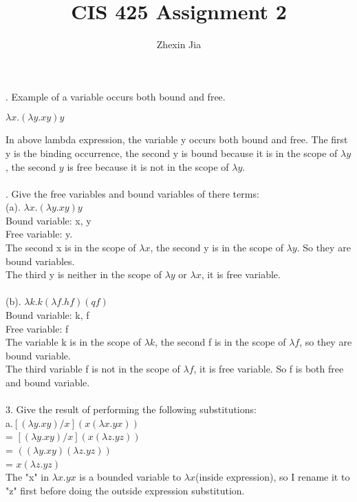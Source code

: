 \documentclass[12pt]{article}
\begin{document}
\title{CIS 425 Assignment 2}
\author{Zhexin Jia}
\maketitle

. Example of a variable occurs both bound and free.
\begin{center}
$\lambda x.(\lambda y.xy)y$
\end{center}
In above lambda expression, the variable y occurs both bound and free. The first y is the binding occurrence, the second y is bound because it is in the scope of $\lambda y$, the second $y$ is free because it is not in the scope of $\lambda y$.\\
\vspace{1mm}\\
. Give the free variables and bound variables of there terms:\\
(a). $\lambda x.(\lambda y.xy)y$\\
Bound variable: x, y\\
Free variable: y. \\
The second x is in the scope of $\lambda x$, the second y is in the scope of $\lambda y$. So they are bound variables.\\
The third y is neither in the scope of $\lambda y$ or $\lambda x$, it is free variable.\\
\vspace{1mm}\\
(b). $\lambda k.k(\lambda f.hf)(qf)$\\
Bound variable: k, f\\
Free variable: f\\
The variable k is in the scope of $\lambda k$, the second f is in the scope of $\lambda f$, so they are bound variable.\\
The third variable f is not in the scope of $\lambda f$, it is free variable. So f is both free and bound variable.\\
\vspace{1mm}\\
3. Give the result of performing the following substitutions:\\
a.$[(\lambda y.xy)/x](x(\lambda x.yx))$\\
= $[(\lambda y.xy)/x](x(\lambda z.yz))$\\
= $((\lambda y.xy)(\lambda z.yz))$\\
= $x(\lambda z.yz)$\\
The "x" in $\lambda x.yx$ is a bounded variable to $\lambda x$(inside expression), so I rename it to "z" first before doing the outside expression substitution.\\
\end{document}

